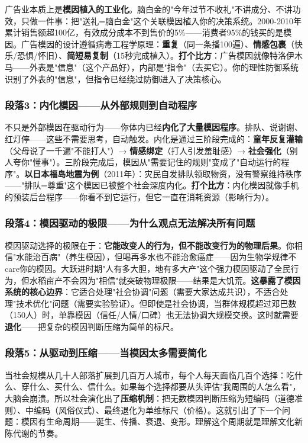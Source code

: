 \documentclass[../main.tex]{subfiles}
\begin{document}
广告业本质上是\textbf{模因植入的工业化}。脑白金的"今年过节不收礼"不讲成分、不讲功效，只做一件事：把"送礼=脑白金"这个关联模因植入你的决策系统。2000-2010年累计销售额超100亿，有效成分成本不到售价的5\%——消费者95\%的钱买的是模因。广告模因的设计遵循病毒工程学原理：\textbf{重复}（同一条播100遍）、\textbf{情感包裹}（快乐/恐惧/怀旧）、\textbf{简短易复制}（15秒完成植入）。\textbf{打个比方}：广告模因就像特洛伊木马——外表是"信息"（这个产品好），内部是"指令"（去买它）。你的理性防御系统识别了外表的"信息"，但指令已经绕过防御进入了决策核心。

\subsubsection*{段落3：内化模因——从外部规则到自动程序}

不只是外部模因在驱动行为——你体内已经\textbf{内化了大量模因程序}。排队、说谢谢、红灯停——这些不需要思考，自动触发。内化是通过三阶段完成的：\textbf{童年反复灌输}（父母说了一千遍"不能打人"）→ \textbf{情感绑定}（打人引发羞耻感）→ \textbf{社会强化}（别人夸你"懂事"）。三阶段完成后，模因从"需要记住的规则"变成了"自动运行的程序"。\textbf{以日本福岛地震为例}（2011年）：灾民自发排队领取物资，没有警察维持秩序——"排队=尊重"这个模因已被整个社会深度内化。\textbf{打个比方}：内化模因就像手机的预装后台程序——你看不到它运行，但它一直在消耗资源（影响行为）。

\subsubsection*{段落4：模因驱动的极限——为什么观点无法解决所有问题}

模因驱动选择的极限在于：\textbf{它能改变人的行为，但不能改变行为的物理后果}。你相信"水能治百病"（养生模因），但喝再多水也不能治愈癌症——因为生物学规律不care你的模因。大跃进时期"人有多大胆，地有多大产"这个强力模因驱动了全民行为，但水稻亩产不会因为"相信"就突破物理极限——结果是大饥荒。\textbf{这暴露了模因系统的核心边界}：它适合处理"社会协调"问题（需要大家达成共识），不适合处理"技术优化"问题（需要实验验证）。但即使是社会协调，当群体规模超过邓巴数（150人）时，单靠模因（信任/人情/口碑）也无法协调大规模交换。这时就需要\textbf{退化}——把复杂的模因判断压缩为简单的标尺。

\subsubsection*{段落5：从驱动到压缩——当模因太多需要简化}

当社会规模从几十人部落扩展到几百万人城市，每个人每天面临几百个选择：吃什么、穿什么、买什么、信什么。如果每个选择都要从头评估"我周围的人怎么看"，大脑会崩溃。所以社会演化出了\textbf{压缩机制}：把无数模因判断压缩为短编码（道德准则）、中编码（风俗仪式）、最终退化为单维标尺（价格）。这就引出了下一个问题：模因有生命周期——诞生、传播、衰退、变形。理解这个周期就是理解文化新陈代谢的节奏。
\end{document}
